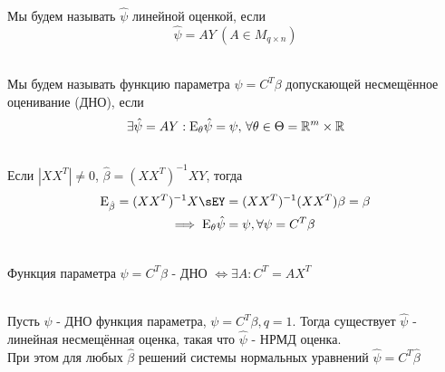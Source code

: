 \documentclass[main.tex]{subfiles}
\begin{document}
\begin{definition} ~\\
	Мы будем называть $\hat \psi$ линейной оценкой, если
	\[\hat\psi = AY\ (A \in M_{q \times n})\]
\end{definition}
\begin{definition} ~\\
	Мы будем называть функцию параметра $\psi = C^T\beta$ допускающей несмещённое оценивание (ДНО), если
	\[\exists \hat \psi = AY: \mathrm{E}_\theta \hat \psi = \psi,\,\forall \theta \in \Theta = \mathbb{R}^m \times \mathbb{R}\]
\end{definition}
\begin{example} ~\\
	Если $|XX^T| \neq 0$, $\hat\beta = (XX^T)^{-1}XY$, тогда
	\begin{align*}
		\sE_{\hat\beta} = (XX^T)^{-1}X\sEY &= (XX^T)^{-1}(XX^T)\beta = \beta\\
		\implies \sE_\theta\hat\psi &= \psi, \forall\psi = C^T\beta
	\end{align*}
\end{example}
\begin{statement} ~\\
	Функция параметра $\psi = C^T\beta$ - ДНО $\iff \exists A: C^T = AX^T$
\end{statement}
\begin{theorem} ~\\
	Пусть $\psi$ - ДНО функция параметра, $\psi = C^T\beta, q = 1$. Тогда существует $\hat\psi$ - линейная несмещённая оценка, такая что $\hat\psi$ - НРМД оценка.\\
	При этом для любых $\hat\beta$ решений системы нормальных уравнений $\hat\psi=C^T\hat\beta$
\end{theorem}
\end{document}
